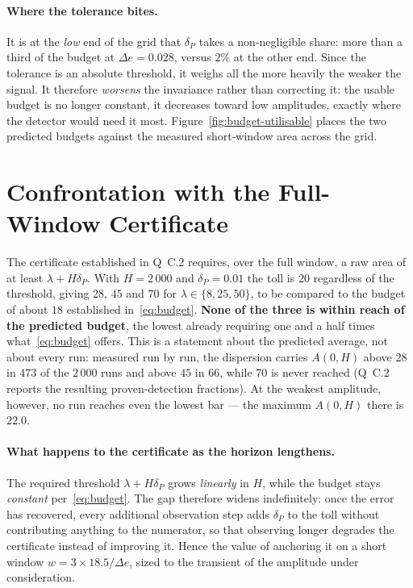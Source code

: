 \documentclass[11pt,a4paper]{article}
\begin{document}
\paragraph{Where the tolerance bites.} It is at the \emph{low} end of the grid that
$\delta_P$ takes a non-negligible share: more than a third of the budget at
$\Delta e = 0.028$, versus $2\%$ at the other end. Since the tolerance is an absolute
threshold, it weighs all the more heavily the weaker the signal. It therefore
\emph{worsens} the invariance rather than correcting it: the usable budget is no
longer constant, it decreases toward low amplitudes, exactly where the detector
would need it most. Figure~\ref{fig:budget-utilisable} places the two predicted budgets
against the measured short-window area across the grid.

\section{Confrontation with the Full-Window Certificate}

The certificate established in Q~C.2 requires, over the full window, a raw area of at
least $\lambda + H\delta_P$. With $H = 2\,000$ and $\delta_P = 0.01$ the toll is $20$
regardless of the threshold, giving $28$, $45$ and $70$ for
$\lambda \in \{8, 25, 50\}$, to be compared to the budget of about $18$ established
in~\eqref{eq:budget}. \textbf{None of the three is within reach of the predicted
budget}, the lowest already requiring one and a half times what~\eqref{eq:budget}
offers. This is a statement about the predicted average, not about every run:
measured run by run, the dispersion carries $A(0,H)$ above $28$ in $473$ of the
$2\,000$ runs and above $45$ in $66$, while $70$ is never reached (Q~C.2 reports the
resulting proven-detection fractions). At the weakest amplitude, however, no run
reaches even the lowest bar --- the maximum $A(0,H)$ there is $22.0$.

\paragraph{What happens to the certificate as the horizon lengthens.} The required
threshold $\lambda + H\delta_P$ grows \emph{linearly} in $H$, while the budget stays
\emph{constant} per~\eqref{eq:budget}. The gap therefore widens indefinitely: once
the error has recovered, every additional observation step adds $\delta_P$ to the toll
without contributing anything to the numerator, so that observing longer degrades the
certificate instead of improving it. Hence the value of anchoring it on a short window
$w = 3 \times 18.5/\Delta e$, sized to the transient of the amplitude under
consideration.
\end{document}
